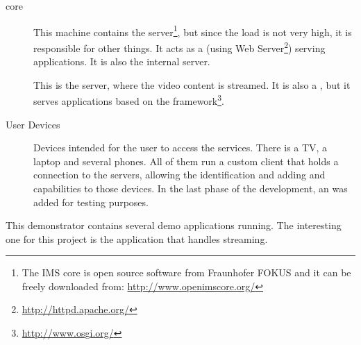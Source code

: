 \begin{description}
  \item[ core] This machine contains the  server\footnote{The IMS core is open source software from Fraunhofer FOKUS and it can be freely downloaded from: \url{http://www.openimscore.org/}}, but since the  load is not very high, it is responsible for other things.
  It acts as a  (using  Web Server\footnote{\url{http://httpd.apache.org/}}) serving  applications.
  It is also the internal  server.
  \item[] This is the  server, where the video content is streamed.
  It is also a , but it serves  applications based on the  framework\footnote{\url{http://www.osgi.org/}}.
  \item[User Devices] Devices intended for the user to access the services.
  There is a TV, a laptop and several phones.
  All of them run a custom  client that holds a connection to the servers, allowing the identification and adding  and  capabilities to those devices.
  In the last phase of the development, an  was added for testing purposes.
\end{description}

This demonstrator contains several demo applications running.
The interesting one for this project is the application that handles  streaming.

